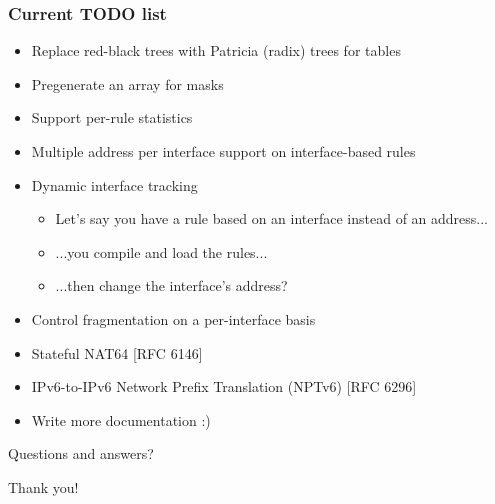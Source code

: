 \documentclass[magyar]{beamer}
\begin{document}
\begin{frame}
\frametitle{Current TODO list}
\begin{itemize}
	\item Replace red-black trees with Patricia (radix) trees for tables
\pause
	\item Pregenerate an array for masks
\pause
	\item Support per-rule statistics
\pause
	\item Multiple address per interface support on interface-based rules
	\item Dynamic interface tracking
		\begin{itemize}
			\item Let's say you have a rule based on an interface instead of an address...
			\item ...you compile and load the rules...
			\item ...then change the interface's address?
		\end{itemize}
	\item Control fragmentation on a per-interface basis
\pause
	\item Stateful NAT64 [RFC 6146]
	\item IPv6-to-IPv6 Network Prefix Translation (NPTv6) [RFC 6296]
\pause
	\item Write more documentation :)
\end{itemize}
\end{frame}

\begin{frame}
\begin{center}
Questions and answers?
\end{center}
\end{frame}

\begin{frame}
\begin{center}
Thank you!
\end{center}
\end{frame}
\end{document}
